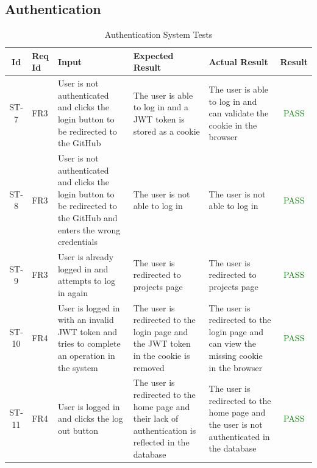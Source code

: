 \documentclass[12pt, titlepage]{article}
\begin{document}
	\subsection{Authentication}
	\begin{center}
		\begin{longtable}{|c|p{1cm}|p{2.7cm}|p{3cm}|p{3cm}|c|}
			\caption{Authentication System Tests \label{long}}\\
			\hline
			\textbf{Id} & \textbf{Req Id} & \textbf{Input} & \textbf{Expected Result} & \textbf{Actual Result} & \textbf{Result} \\
			\hline
			ST-7 & FR3 & User is not authenticated and clicks the login button to be redirected to the GitHub & The user is able to log in and a JWT token is stored as a cookie & The user is able to log in and can validate the cookie in the browser & \textcolor{green}{PASS} \\
			\hline
			ST-8 & FR3 & User is not authenticated and clicks the login button to be redirected to the GitHub and enters the wrong credentials & The user is not able to log in & The user is not able to log in & \textcolor{green}{PASS} \\
			\hline
			ST-9 & FR3 & User is already logged in and attempts to log in again & The user is redirected to projects page & The user is redirected to projects page & \textcolor{green}{PASS} \\
			\hline
			ST-10 & FR4 & User is logged in with an invalid JWT token and tries to complete an operation in the system & The user is redirected to the login page and the JWT token in the cookie is removed & The user is redirected to the login page and can view the missing cookie in the browser & \textcolor{green}{PASS} \\ 
			\hline
			ST-11 & FR4 & User is logged in and clicks the log out button & The user is redirected to the home page and their lack of authentication is reflected in the database & The user is redirected to the home page and the user is not authenticated in the database & \textcolor{green}{PASS} \\
			\hline
		\end{longtable}
	\end{center}
	
\end{document}
